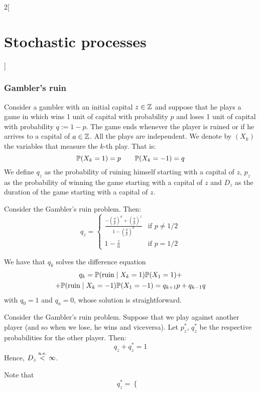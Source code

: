 \documentclass[../../../main_math.tex]{subfiles}
\begin{document}
\begin{multicols}{2}[\section{Stochastic processes}]
  \subsubsection{Gambler's ruin}
  \begin{definition}
    Consider a gambler with an initial capital $z\in\ZZ$ and suppose that he plays a game in which wins 1 unit of capital with probability $p$ and loses 1 unit of capital with probability $q:=1-p$. The game ends whenever the player is ruined or if he arrives to a capital of $a\in\ZZ$. All the plays are independent. We denote by $(X_k)$ the variables that measure the $k$-th play. That is: $$\Prob(X_k=1)=p\qquad\Prob(X_k=-1)=q$$
    We define $q_z$ as the probability of ruining himself starting with a capital of $z$, $p_z$ as the probability of winning the game starting with a capital of $z$ and $D_z$ as the duration of the game starting with a capital of $z$.
  \end{definition}
  \begin{proposition}
    Consider the Gambler's ruin problem. Then:
    $$q_z=\begin{cases}
        \frac{-{\left(\frac{q}{p}\right)}^a+{\left(\frac{q}{p}\right)}^z}{1-{\left(\frac{q}{p}\right)}^a} & \text{if $p\ne 1/2$} \\
        1-\frac{z}{a}                                                                                     & \text{if $p= 1/2$}
      \end{cases}$$
  \end{proposition}
  \begin{sproof}
    We have that $q_k$ solves the difference equation
    \begin{multline*}
      q_k =\mathbb{P}(\text{ruin}\mid X_k=1)\mathbb{P}(X_1=1)+\\
      +\mathbb{P}(\text{ruin}\mid X_k=-1)\mathbb{P}(X_1=-1) =q_{k+1}p+q_{k-1}q
    \end{multline*}
    with $q_0=1$ and $q_a=0$, whose solution is straightforward.
  \end{sproof}
  \begin{proposition}
    Consider the Gambler's ruin problem. Suppose that we play against another player (and so when we lose, he wins and viceversa). Let $p_z^*$, $q_z^*$ be the respective probabilities for the other player. Then:
    $$q_z+q_z^*=1$$
    Hence, $D_z\almoste{<}\infty$.
  \end{proposition}
  \begin{sproof}
    Note that
    $$q_z^*=\begin{cases}

\end{cases}$$
\end{sproof}
\end{multicols}
\end{document}
